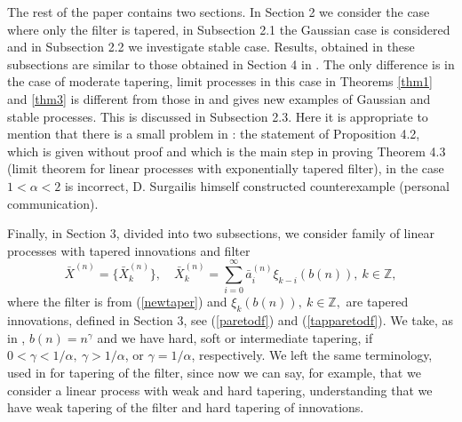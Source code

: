 \documentclass[12pt]{article}
\def\bz{{\bf Z}}
\def\bz{{\mathbb Z}} %
\def\a{\alpha}
\def\g{\gamma}
\theoremstyle{plain}
\theoremstyle{definition}
\begin{document}
The rest of the paper contains two sections. In Section 2 we consider the case where only the filter is tapered, in Subsection 2.1 the Gaussian case is considered and in Subsection 2.2 we investigate stable case.
 Results, obtained in these subsections  are similar to those obtained in Section 4 in \cite{Sabzikar}. The only difference is in the case of moderate tapering, limit processes in this case in Theorems \ref{thm1} and \ref{thm3} is different from those in \cite{Sabzikar} and gives new examples of Gaussian and stable processes. This is discussed in Subsection 2.3. Here it is appropriate to mention that there is a small problem in \cite{Sabzikar}: the statement of Proposition 4.2, which is given without proof and which is the main step in proving Theorem 4.3 (limit theorem for linear processes with exponentially tapered filter), in the case $1<\a<2$ is incorrect, D. Surgailis himself constructed counterexample (personal communication).

Finally, in Section 3, divided into two subsections, we consider family of linear processes with tapered innovations and filter
\begin{equation}\label{trunkfilinn}
{\bar X}^{(n)}=\{{\bar X}_k^{(n)} \}, \quad   {\bar X}_k^{(n)}=\sum_{i=0}^\infty {\bar a}_i^{(n)}\xi_{k-i}(b(n)), \ k\in \bz,
\end{equation}
where the filter  is from (\ref{newtaper}) and $\xi_{k}(b(n)), \ k\in \bz,$ are tapered innovations, defined in Section 3, see (\ref{paretodf}) and (\ref{tapparetodf}). We  take, as in \cite{Paul21},  $b(n)=n^\g$ and we  have hard, soft or intermediate tapering, if $0<\g<1/\a, \ \g>1/\a$, or $\g=1/\a$, respectively. We left the same terminology, used in \cite{Sabzikar} for tapering of the filter, since now we can say, for example, that we consider a linear process with weak and hard tapering, understanding that we have weak tapering of the filter and  hard tapering of innovations.
\end{document}

